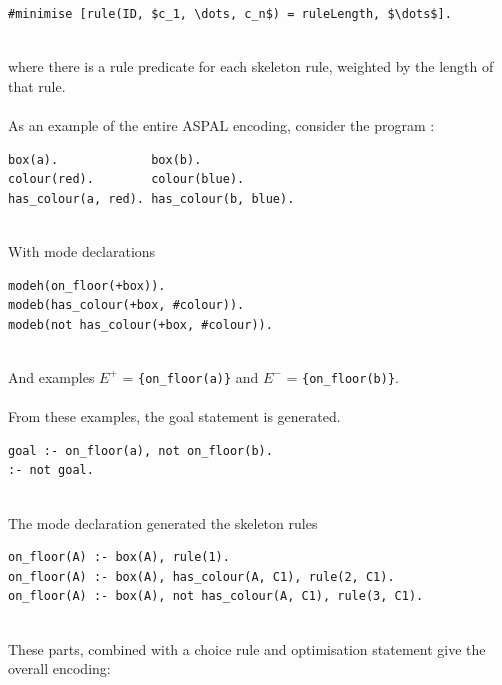 \begin{lstlisting}[mathescape=true]
#minimise [rule(ID, $c_1, \dots, c_n$) = ruleLength, $\dots$].
\end{lstlisting}
\mbox{}\\
where there is a rule predicate for each skeleton rule, weighted by the length of that rule.\\ \\
As an example of the entire ASPAL encoding, consider the program :

\begin{lstlisting}
box(a).				box(b).
colour(red).		colour(blue).
has_colour(a, red).	has_colour(b, blue).
\end{lstlisting}
\mbox{}\\
With mode declarations \\ 

\begin{lstlisting}
modeh(on_floor(+box)).
modeb(has_colour(+box, #colour)).
modeb(not has_colour(+box, #colour)).
\end{lstlisting}
\mbox{}\\
And examples $E^+$ = \lstinline!{on_floor(a)}! and $E^-$ = \lstinline!{on_floor(b)}!. \\ \\
From these examples, the goal statement is generated. \\

\begin{lstlisting}
goal :- on_floor(a), not on_floor(b).
:- not goal.
\end{lstlisting}
\mbox{}\\
The mode declaration generated the skeleton rules \\

\begin{lstlisting}
on_floor(A) :- box(A), rule(1).
on_floor(A) :- box(A), has_colour(A, C1), rule(2, C1).
on_floor(A) :- box(A), not has_colour(A, C1), rule(3, C1).
\end{lstlisting}
\mbox{}\\
These parts, combined with a choice rule and optimisation statement give the overall encoding:\\

